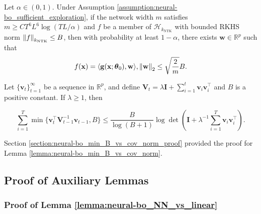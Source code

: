 \begin{auxlemma} 
\label{lemma:neural-bo_RKHS_expression}
Let $\alpha \in (0,1)$. Under Assumption \ref{assumption:neural-bo_sufficient_exploration}, if the network width $m$ satisfies  $m \geq C T^6L^6 \log(TL/\alpha)$ and $f$ be a member of $\mathcal{H}_{k_\text{NTK}}$ with bounded RKHS norm $\norm{f}_{k_\text{NTK}} \leq B$, then with probability at least $1-\alpha$, there exists $\mathbf{w} \in \mathbb{R}^p$ such that 
\[ f(\mathbf{x}) = \langle \mathbf{g}(\mathbf{x}; \boldsymbol{\theta}_0), \mathbf{w} \rangle, \norm{\mathbf{w}}_2 \leq \sqrt{\frac{2}{m}}B.\]
\end{auxlemma}

\begin{auxlemma}
\label{lemma:neural-bo_min_B_vs_cov_norm}
Let $\{ \mathbf{v}_t\}_{t=1}^\infty$ be a sequence in $\mathbb{R}^p$, and
define $\mathbf{V}_t = \lambda \mathbf{I} + \sum^t_{i=1} \mathbf{v}_i\mathbf{v}_i^\top$ and $B$ is a positive constant. If $\lambda \geq 1$, then

\[ 
\sum_{i=1}^T \min \{ \mathbf{v}_t^\top \mathbf{V}_{t-1}^{-1}\mathbf{v}_{t-1}, B\} \leq \frac{B}{\log(B+1)} \log \det(\mathbf{I} + \lambda^{-1}\sum_{i=1}^T \mathbf{v}_i\mathbf{v}_i^\top).
\]
\end{auxlemma}
\noindent Section \ref{section:neural-bo_min_B_vs_cov_norm_proof} provided the proof for Lemma \ref{lemma:neural-bo_min_B_vs_cov_norm}. 
\subsection{Proof of Auxiliary Lemmas}
\label{section:neural-bo_aux_proofs}
\subsubsection{Proof of Lemma \ref{lemma:neural-bo_NN_vs_linear}}
\label{section:neural-bo_NN_vs_linear_proof}

